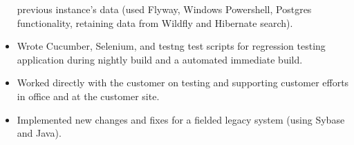 \documentclass[12pt, line, margin]{res}
\begin{document}
\begin{resume}
\begin{itemize}
                        previous instance's data (used Flyway, Windows Powershell,\newline
                        Postgres functionality, retaining data from Wildfly and Hibernate search).
              \item   Wrote Cucumber, Selenium, and testng test scripts for regression \newline
			testing application during nightly build and a automated \newline 
			immediate build.
	      \item   Worked directly with the customer on testing and supporting \newline
			customer efforts in office and at the customer site.
	      \item   Implemented new changes and fixes for a fielded legacy system \newline
                        (using Sybase and Java).
                \end{itemize}
 
\pagebreak


\end{resume}
\end{document}
